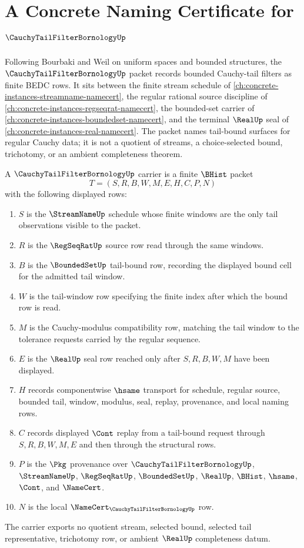 \chapter{A Concrete Naming Certificate for $\CauchyTailFilterBornologyUp$}
\label{ch:concrete-instances-cauchy-tail-filter-bornology-namecert}

Following Bourbaki and Weil on uniform spaces and bounded structures, the $\CauchyTailFilterBornologyUp$ packet records bounded Cauchy-tail filters as finite BEDC rows. It sits between the finite stream schedule of \autoref{ch:concrete-instances-streamname-namecert}, the regular rational source discipline of \autoref{ch:concrete-instances-regseqrat-namecert}, the bounded-set carrier of \autoref{ch:concrete-instances-boundedset-namecert}, and the terminal $\RealUp$ seal of \autoref{ch:concrete-instances-real-namecert}. The packet names tail-bound surfaces for regular Cauchy data; it is not a quotient of streams, a choice-selected bound, trichotomy, or an ambient completeness theorem.

\begin{definition}\label{def:cauchy-tail-filter-bornology-carrier}
A $\CauchyTailFilterBornologyUp$ carrier is a finite $\BHist$ packet
$$
T=(S,R,B,W,M,E,H,C,P,N)
$$
with the following displayed rows:
\begin{enumerate}
\item $S$ is the $\StreamNameUp$ schedule whose finite windows are the only tail observations visible to the packet.
\item $R$ is the $\RegSeqRatUp$ source row read through the same windows.
\item $B$ is the $\BoundedSetUp$ tail-bound row, recording the displayed bound cell for the admitted tail window.
\item $W$ is the tail-window row specifying the finite index after which the bound row is read.
\item $M$ is the Cauchy-modulus compatibility row, matching the tail window to the tolerance requests carried by the regular sequence.
\item $E$ is the $\RealUp$ seal row reached only after $S,R,B,W,M$ have been displayed.
\item $H$ records componentwise $\hsame$ transport for schedule, regular source, bounded tail, window, modulus, seal, replay, provenance, and local naming rows.
\item $C$ records displayed $\Cont$ replay from a tail-bound request through $S,R,B,W,M,E$ and then through the structural rows.
\item $P$ is the $\Pkg$ provenance over $\CauchyTailFilterBornologyUp$, $\StreamNameUp$, $\RegSeqRatUp$, $\BoundedSetUp$, $\RealUp$, $\BHist$, $\hsame$, $\Cont$, and $\NameCert$.
\item $N$ is the local $\NameCert_{\CauchyTailFilterBornologyUp}$ row.
\end{enumerate}
The carrier exports no quotient stream, selected bound, selected tail representative, trichotomy row, or ambient $\RealUp$ completeness datum.
\end{definition}

